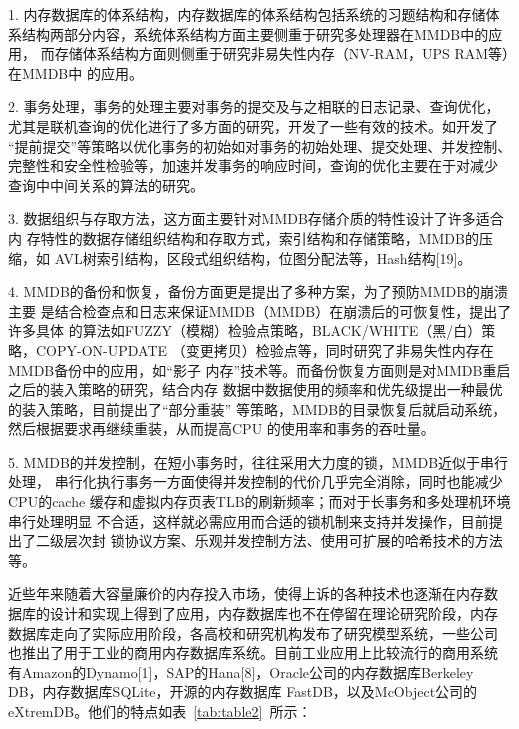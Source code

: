 \documentclass[literaturereview]{zjutreport}
\begin{document}
1. 内存数据库的体系结构，内存数据库的体系结构包括系统的习题结构和存储体
系结构两部分内容，系统体系结构方面主要侧重于研究多处理器在MMDB中的应用，
而存储体系结构方面则侧重于研究非易失性内存（NV-RAM，UPS RAM等）在MMDB中
的应用。

2. 事务处理，事务的处理主要对事务的提交及与之相联的日志记录、查询优化，
尤其是联机查询的优化进行了多方面的研究，开发了一些有效的技术。如开发了
“提前提交”等策略以优化事务的初始如对事务的初始处理、提交处理、并发控制、
完整性和安全性检验等，加速并发事务的响应时间，查询的优化主要在于对减少
查询中中间关系的算法的研究。

3. 数据组织与存取方法，这方面主要针对MMDB存储介质的特性设计了许多适合内
存特性的数据存储组织结构和存取方式，索引结构和存储策略，MMDB的压缩，如
AVL树索引结构，区段式组织结构，位图分配法等，Hash结构[19]。

4. MMDB的备份和恢复，备份方面更是提出了多种方案，为了预防MMDB的崩溃主要
是结合检查点和日志来保证MMDB（MMDB）在崩溃后的可恢复性，提出了许多具体
的算法如FUZZY（模糊）检验点策略，BLACK/WHITE（黑/白）策略，COPY-ON-UPDATE
（变更拷贝）检验点等，同时研究了非易失性内存在MMDB备份中的应用，如“影子
内存”技术等。而备份恢复方面则是对MMDB重启之后的装入策略的研究，结合内存
数据中数据使用的频率和优先级提出一种最优的装入策略，目前提出了“部分重装”
等策略，MMDB的目录恢复后就启动系统，然后根据要求再继续重装，从而提高CPU
的使用率和事务的吞吐量。

5. MMDB的并发控制，在短小事务时，往往采用大力度的锁，MMDB近似于串行处理，
串行化执行事务一方面使得并发控制的代价几乎完全消除，同时也能减少CPU的cache
缓存和虚拟内存页表TLB的刷新频率；而对于长事务和多处理机环境串行处理明显
不合适，这样就必需应用而合适的锁机制来支持并发操作，目前提出了二级层次封
锁协议方案、乐观并发控制方法、使用可扩展的哈希技术的方法等。

近些年来随着大容量廉价的内存投入市场，使得上诉的各种技术也逐渐在内存数
据库的设计和实现上得到了应用，内存数据库也不在停留在理论研究阶段，内存
数据库走向了实际应用阶段，各高校和研究机构发布了研究模型系统，一些公司
也推出了用于工业的商用内存数据库系统。目前工业应用上比较流行的商用系统
有Amazon的Dynamo[1]，SAP的Hana[8]，Oracle公司的内存数据库Berkeley DB，内存数据库SQLite，开源的内存数据库
FastDB，以及McObject公司的eXtremDB。他们的特点如表~\ref{tab:table2}~所示：
\end{document}
